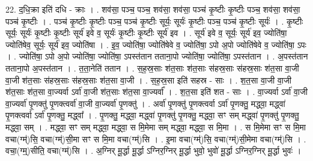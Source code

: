 \documentclass[17pt]{extarticle}
\begin{document}
22. द॒धि॒क्रा इति॑ दधि - क्राः । . शव॑सा॒ पञ्च॒ पञ्च॒ शव॑सा॒ शव॑सा॒ पञ्च॑ कृ॒ष्टीः कृ॒ष्टीः पञ्च॒ शव॑सा॒ शव॑सा॒ पञ्च॑ कृ॒ष्टीः । . पञ्च॑ कृ॒ष्टीः कृ॒ष्टीः पञ्च॒ पञ्च॑ कृ॒ष्टीः सूर्यः॒ सूर्यः॑ कृ॒ष्टीः पञ्च॒ पञ्च॑ कृ॒ष्टीः सूर्यः॑ । . कृ॒ष्टीः सूर्यः॒ सूर्यः॑ कृ॒ष्टीः कृ॒ष्टीः सूर्य॑ इवे व॒ सूर्यः॑ कृ॒ष्टीः कृ॒ष्टीः सूर्य॑ इव । . सूर्य॑ इवे व॒ सूर्यः॒ सूर्य॑ इव॒ ज्योति॑षा॒ ज्योति॑षेव॒ सूर्यः॒ सूर्य॑ इव॒ ज्योति॑षा । . इ॒व॒ ज्योति॑षा॒ ज्योति॑षेवे व॒ ज्योति॑षा॒ ऽपो अ॒पो ज्योति॑षेवे व॒ ज्योति॑षा॒ ऽपः । . ज्योति॑षा॒ ऽपो अ॒पो ज्योति॑षा॒ ज्योति॑षा॒ ऽपस्त॑तान तताना॒पो ज्योति॑षा॒ ज्योति॑षा॒ ऽपस्त॑तान । . अ॒पस्त॑तान तताना॒पो अ॒पस्त॑तान । . त॒ता॒नेति॑ ततान । . स॒ह॒स्र॒साः श॑त॒साः श॑त॒साः स॑हस्र॒साः स॑हस्र॒साः श॑त॒सा वा॒जी वा॒जी श॑त॒साः स॑हस्र॒साः स॑हस्र॒साः श॑त॒सा वा॒जी । . स॒ह॒स्र॒सा इति॑ सहस्र - साः । . श॒त॒सा वा॒जी वा॒जी श॑त॒साः श॑त॒सा वा॒ज्यर्वा ऽर्वा॑ वा॒जी श॑त॒साः श॑त॒सा वा॒ज्यर्वा᳚ । . श॒त॒सा इति॑ शत - साः । . वा॒ज्यर्वा ऽर्वा॑ वा॒जी वा॒ज्यर्वा॑ पृ॒णक्तु॑ पृ॒णक्त्वर्वा॑ वा॒जी वा॒ज्यर्वा॑ पृ॒णक्तु॑ । . अर्वा॑ पृ॒णक्तु॑ पृ॒णक्त्वर्वा ऽर्वा॑ पृ॒णक्तु॒ मद्ध्वा॒ मद्ध्वा॑ पृ॒णक्त्वर्वा ऽर्वा॑ पृ॒णक्तु॒ मद्ध्वा᳚ । . पृ॒णक्तु॒ मद्ध्वा॒ मद्ध्वा॑ पृ॒णक्तु॑ पृ॒णक्तु॒ मद्ध्वा॒ सꣳ सम् मद्ध्वा॑ पृ॒णक्तु॑ पृ॒णक्तु॒ मद्ध्वा॒ सम् । . मद्ध्वा॒ सꣳ सम् मद्ध्वा॒ मद्ध्वा॒ स मि॒मेमा सम् मद्ध्वा॒ मद्ध्वा॒ स मि॒मा । . स मि॒मेमा सꣳ स मि॒मा वचा(ग्म्॑)सि॒ वचा(ग्म्॑)सी॒मा सꣳ स मि॒मा वचा(ग्म्॑)सि । . इ॒मा वचा(ग्म्॑)सि॒ वचा(ग्म्॑)सी॒मेमा वचा(ग्म्॑)सि । . वचा॒(ग्म्॒)सीति॒ वचा(ग्म्॑)सि । . अ॒ग्निर् मू॒र्द्धा मू॒र्द्धा ऽग्निर॒ग्निर् मू॒र्द्धा भुवो॒ भुवो॑ मू॒र्द्धा ऽग्निर॒ग्निर् मू॒र्द्धा भुवः॑ । \newline
\end{document}
